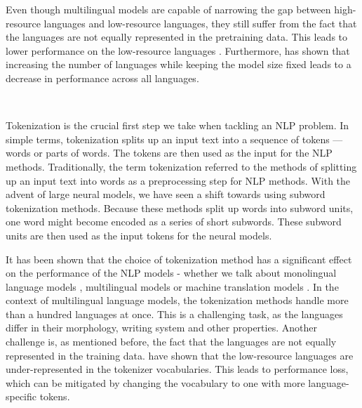Even though multilingual models are capable of narrowing the gap between high-resource languages and low-resource languages, they still suffer from the fact that the languages are not equally represented in the pretraining data. This leads to lower performance on the low-resource languages \cite{conneau_unsupervised_2020}. Furthermore, \citet{conneau_unsupervised_2020} has shown that increasing the number of languages while keeping the model size fixed leads to a decrease in performance across all languages. \cite{conneau_unsupervised_2020}

~

Tokenization is the crucial first step we take when tackling an NLP problem. In simple terms, tokenization splits up an input text into a sequence of tokens --- words or parts of words. The tokens are then used as the input for the NLP methods. Traditionally, the term tokenization referred to the methods of splitting up an input text into words as a preprocessing step for NLP methods. With the advent of large neural models, we have seen a shift towards using subword tokenization methods. Because these methods split up words into subword units, one word might become encoded as a series of short subwords. These subword units are then used as the input tokens for the neural models. 

It has been shown that the choice of tokenization method has a significant effect on the performance of the NLP models - whether we talk about monolingual language models \cite{bostrom_byte_2020}, multilingual models \cite{rust_how_2021} or machine translation models \cite{kudo_sentencepiece_2018,gowda_finding_2020}. In the context of multilingual language models, the tokenization methods handle more than a hundred languages at once. This is a challenging task, as the languages differ in their morphology, writing system and other properties. Another challenge is, as mentioned before, the fact that the languages are not equally represented in the training data. \citet{rust_how_2021} have shown that the low-resource languages are under-represented in the tokenizer vocabularies. This leads to performance loss, which can be mitigated by changing the vocabulary to one with more language-specific tokens. \cite{rust_how_2021}


